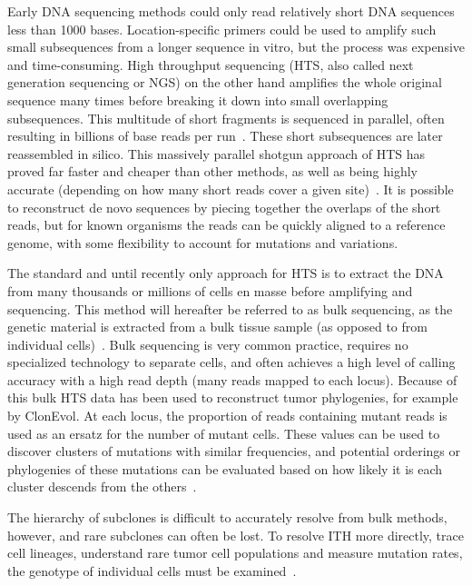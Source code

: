 \documentclass[../../main.tex]{subfiles}
\begin{document}
Early DNA sequencing methods could only read relatively short DNA sequences less than 1000 bases.
Location-specific primers could be used to amplify such small subsequences from a longer sequence in vitro, but the process was expensive and time-consuming.
High throughput sequencing (HTS, also called next generation sequencing or NGS) on the other hand amplifies the whole original sequence many times before breaking it down into small overlapping subsequences.
This multitude of short fragments is sequenced in parallel, often resulting in billions of base reads per run~\cite{sequencesequencers}.
These short subsequences are later reassembled in silico.
This massively parallel shotgun approach of HTS has proved far faster and cheaper than other methods, as well as being highly accurate (depending on how many short reads cover a given site)~\cite{massivelyparallel}.
It is possible to reconstruct de novo sequences by piecing together the overlaps of the short reads, but for known organisms the reads can be quickly aligned to a reference genome, with some flexibility to account for mutations and variations.

The standard and until recently only approach for HTS is to extract the DNA from many thousands or millions of cells en masse before amplifying and sequencing.
This method will hereafter be referred to as bulk sequencing, as the genetic material is extracted from a bulk tissue sample (as opposed to from individual cells)~\cite{SCSadvance}.
Bulk sequencing is very common practice, requires no specialized technology to separate cells, and often achieves a high level of calling accuracy with a high read depth (many reads mapped to each locus).
Because of this bulk HTS data has been used to reconstruct tumor phylogenies, for example by ClonEvol.
At each locus, the proportion of reads containing mutant reads is used as an ersatz for the number of mutant cells.
These values can be used to discover clusters of mutations with similar frequencies, and potential orderings or phylogenies of these mutations can be evaluated based on how likely it is each cluster descends from the others~\cite{clonevol}.

The hierarchy of subclones is difficult to accurately resolve from bulk methods, however, and rare subclones can often be lost.
To resolve ITH more directly, trace cell lineages, understand rare tumor cell populations and measure mutation rates, the genotype of individual cells must be examined~\cite{onecelltime}.
\end{document}
